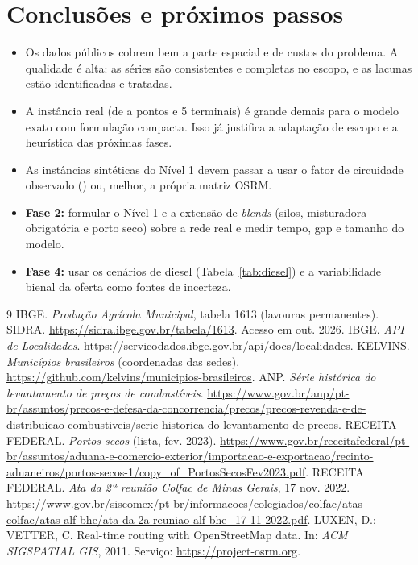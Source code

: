 \documentclass[11pt,a4paper]{article}
\begin{document}
\section{Conclusões e próximos passos}

\begin{itemize}
  \item Os dados públicos cobrem bem a parte espacial e de custos do problema. A qualidade é alta: as séries são
        consistentes e completas no escopo, e as lacunas estão identificadas e tratadas.
  \item A instância real (de \NSulOitenta{} a \NMunSul{} pontos e 5 terminais) é grande demais para o modelo exato com
        formulação compacta. Isso já justifica a adaptação de escopo e a heurística das próximas fases.
  \item As instâncias sintéticas do Nível 1 devem passar a usar o fator de circuidade observado (\CircMed) ou, melhor,
        a própria matriz OSRM.
  \item \textbf{Fase 2:} formular o Nível 1 e a extensão de \emph{blends} (silos, misturadora obrigatória e porto seco)
        sobre a rede real e medir tempo, gap e tamanho do modelo.
  \item \textbf{Fase 4:} usar os cenários de diesel (Tabela~\ref{tab:diesel}) e a variabilidade bienal da oferta como
        fontes de incerteza.
\end{itemize}

\begin{thebibliography}{9}\small
{} IBGE. \emph{Produção Agrícola Municipal}, tabela 1613 (lavouras permanentes). SIDRA.
  \url{https://sidra.ibge.gov.br/tabela/1613}. Acesso em out. 2026.
 IBGE. \emph{API de Localidades}. \url{https://servicodados.ibge.gov.br/api/docs/localidades}.
 KELVINS. \emph{Municípios brasileiros} (coordenadas das sedes).
  \url{https://github.com/kelvins/municipios-brasileiros}.
 ANP. \emph{Série histórica do levantamento de preços de combustíveis}.
  \url{https://www.gov.br/anp/pt-br/assuntos/precos-e-defesa-da-concorrencia/precos/precos-revenda-e-de-distribuicao-combustiveis/serie-historica-do-levantamento-de-precos}.
 RECEITA FEDERAL. \emph{Portos secos} (lista, fev. 2023).
  \url{https://www.gov.br/receitafederal/pt-br/assuntos/aduana-e-comercio-exterior/importacao-e-exportacao/recinto-aduaneiros/portos-secos-1/copy_of_PortosSecosFev2023.pdf}.
 RECEITA FEDERAL. \emph{Ata da 2ª reunião Colfac de Minas Gerais}, 17 nov. 2022.
  \url{https://www.gov.br/siscomex/pt-br/informacoes/colegiados/colfac/atas-colfac/atas-alf-bhe/ata-da-2a-reuniao-alf-bhe_17-11-2022.pdf}.
 LUXEN, D.; VETTER, C. Real-time routing with OpenStreetMap data. In: \emph{ACM SIGSPATIAL GIS}, 2011.
  Serviço: \url{https://project-osrm.org}.
\end{thebibliography}
\end{document}

